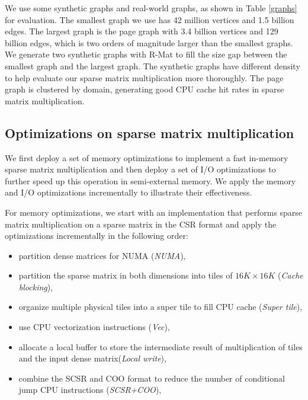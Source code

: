 We use some synthetic graphs and real-world graphs, as shown in Table \ref{graphs}
for evaluation. The smallest graph we use has 42 million vertices and 1.5 billion
edges. The largest graph is the page graph with 3.4 billion vertices
and 129 billion edges, which is two orders of magnitude larger than the smallest
graphs. We generate two synthetic graphs with R-Mat \cite{rmat} to fill
the size gap between the smallest graph and the largest graph. The synthetic graphs
have different density to help evaluate our sparse matrix multiplication more
thoroughly. The page graph is clustered by domain, generating good CPU cache
hit rates in sparse matrix multiplication.

\subsection{Optimizations on sparse matrix multiplication}
We first deploy a set of memory optimizations to implement a fast
in-memory sparse matrix multiplication and then deploy a set of I/O
optimizations to further speed up this operation in semi-external memory.
We apply the memory and I/O optimizations incrementally to illustrate their
effectiveness.

For memory optimizations, we start with an implementation that performs sparse
matrix multiplication on a sparse matrix in the CSR format and apply
the optimizations incrementally in the following order:
\begin{itemize} \itemsep1pt \parskip0pt 
		\item partition dense matrices for NUMA (\textit{NUMA}),
	\item partition the sparse matrix in both dimensions into tiles of
		$16K \times 16K$ (\textit{Cache blocking}),
	\item organize multiple physical tiles into a super tile to fill CPU cache
		(\textit{Super tile}),
	\item use CPU vectorization instructions (\textit{Vec}),
	\item allocate a local buffer to store the intermediate result of
		multiplication of tiles and the input dense matrix(\textit{Local write}),
	\item combine the SCSR and COO format to reduce the number of conditional
		jump CPU instructions (\textit{SCSR+COO}),
\end{itemize}


